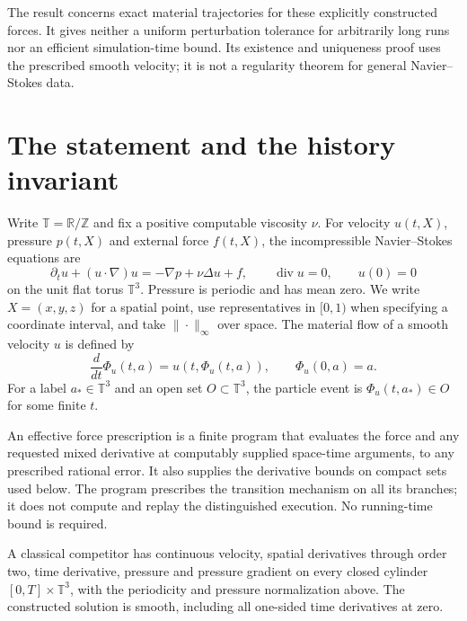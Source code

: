 \documentclass[11pt]{article}
\newcommand{\T}{\mathbb T}
\newcommand{\R}{\mathbb R}
\newcommand{\Z}{\mathbb Z}
\DeclareMathOperator{\diver}{div}
\begin{document}
The result concerns exact material trajectories for these explicitly
constructed forces. It gives neither a uniform perturbation tolerance
for arbitrarily long runs nor an efficient simulation-time bound. Its
existence and uniqueness proof uses the prescribed smooth velocity;
it is not a regularity theorem for general Navier--Stokes data.

\section{The statement and the history invariant}\label{sec:statement}

Write $\T=\R/\Z$ and fix a positive computable viscosity $\nu$.
For velocity $u(t,X)$, pressure $p(t,X)$ and external force $f(t,X)$,
the incompressible Navier--Stokes equations are
\begin{equation}\label{eq:NS}
 \partial_tu+(u\cdot\nabla)u=-\nabla p+\nu\Delta u+f,
 \qquad \diver u=0,\qquad u(0)=0
\end{equation}
on the unit flat torus $\T^3$. Pressure is periodic and has mean zero.
We write $X=(x,y,z)$ for a spatial point, use representatives in $[0,1)$
when specifying a coordinate interval, and take $\|\cdot\|_\infty$ over
space. The material flow of a smooth velocity $u$ is defined by
\[
 \frac{d}{dt}\Phi_u(t,a)=u(t,\Phi_u(t,a)),\qquad \Phi_u(0,a)=a.
\]
For a label $a_*\in\T^3$ and an open set $O\subset\T^3$, the
particle event is $\Phi_u(t,a_*)\in O$ for some finite $t$.

An effective force prescription is a finite program that evaluates the
force and any requested mixed derivative at computably supplied space-time
arguments, to any prescribed rational error. It also supplies the derivative
bounds on compact sets used below. The program prescribes the transition
mechanism on all its branches; it does not compute and replay the
distinguished execution. No running-time bound is required.

A classical competitor has continuous velocity, spatial derivatives through
order two, time derivative, pressure and pressure gradient on every closed
cylinder $[0,T]\times\T^3$, with the periodicity and pressure normalization
above. The constructed solution is smooth, including all one-sided time
derivatives at zero.
\end{document}
